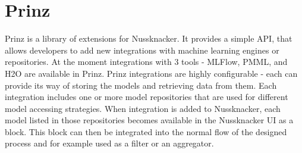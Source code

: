 \section{Prinz}

Prinz is a library of extensions for Nussknacker.
It provides a simple API, that allows developers to add new integrations with machine learning engines or repositories.
At the moment integrations with 3 tools - MLFlow, PMML, and H2O are available in Prinz.
Prinz integrations are highly configurable - each can provide its way of storing the models and retrieving data from them.
Each integration includes one or more model repositories that are used for different model accessing strategies.
When integration is added to Nussknacker, each model listed in those repositories becomes available in the Nussknacker UI as a block.
This block can then be integrated into the normal flow of the designed process and for example used as a filter or an aggregator.
